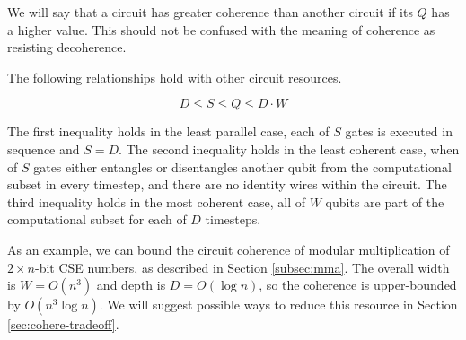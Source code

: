 We will say that a circuit has greater coherence than another circuit if
its $Q$ has a higher value. This should not be confused with the
meaning of coherence as resisting decoherence.

The following relationships hold with other circuit resources.

\begin{equation}
D \le S \le Q \le D\cdot W
\end{equation}

The first inequality holds in the least parallel case, each of $S$ gates is executed in sequence
and $S=D$. The second inequality holds in the least coherent case, when of $S$ gates
either entangles or disentangles another qubit from the computational subset in every timestep, and
there are no identity wires within the circuit. The third inequality holds in the
most coherent case, all of $W$ qubits are part of the computational subset for each of $D$ timesteps.

As an example, we can bound the circuit coherence of modular multiplication of $2\times n$-bit
CSE numbers, as described in Section \ref{subsec:mma}. The overall width is $W = O(n^3)$ and
depth is $D=O(\log n)$, so the coherence is upper-bounded by $O(n^3\log n)$. We will suggest possible
ways to reduce this resource in Section \ref{sec:cohere-tradeoff}.

